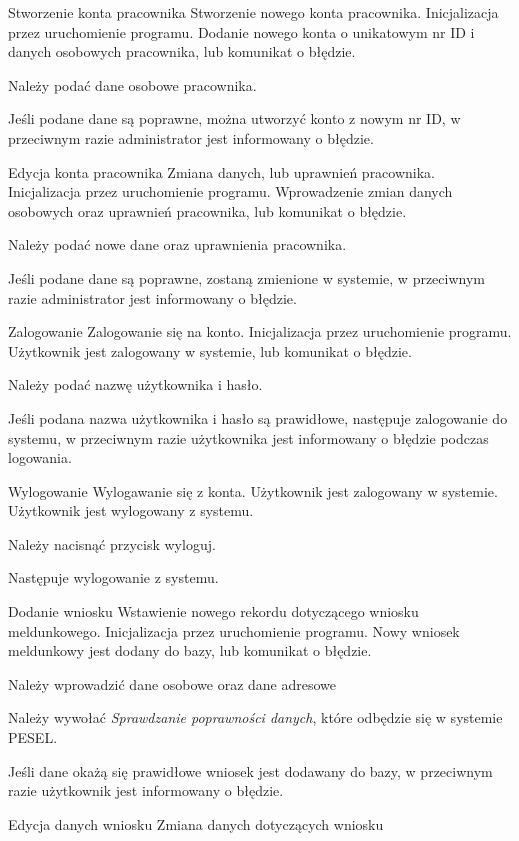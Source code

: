\documentclass[12pt]{article}
\begin{document}
\scenario
    {Stworzenie konta pracownika}
    {Stworzenie nowego konta pracownika.}
    {Inicjalizacja przez uruchomienie programu.}
    {Dodanie nowego konta o unikatowym nr ID i danych osobowych pracownika, lub komunikat o błędzie.}
    {
        \item Należy podać dane osobowe pracownika.
        \item Jeśli podane dane są poprawne, można utworzyć konto z nowym nr ID, w przeciwnym razie administrator jest informowany o błędzie.
    }
\scenario
    {Edycja konta pracownika}
    {Zmiana danych, lub uprawnień pracownika.}
    {Inicjalizacja przez uruchomienie programu.}
    {Wprowadzenie zmian danych osobowych oraz uprawnień pracownika, lub komunikat o błędzie.}
    {
        \item Należy podać nowe dane oraz uprawnienia pracownika.
        \item Jeśli podane dane są poprawne, zostaną zmienione w systemie, w przeciwnym razie administrator jest informowany o błędzie.
    }
\scenario
    {Zalogowanie}
    {Zalogowanie się na konto.}
    {Inicjalizacja przez uruchomienie programu.}
    {Użytkownik jest zalogowany w systemie, lub komunikat o błędzie.}
    {
        \item Należy podać nazwę użytkownika i hasło.
        \item Jeśli podana nazwa użytkownika i hasło są prawidłowe, następuje zalogowanie do systemu, w przeciwnym razie użytkownika jest informowany o błędzie podczas logowania.
    }
\scenario
    {Wylogowanie}
    {Wylogawanie się z konta.}
    {Użytkownik jest zalogowany w systemie. }
    {Użytkownik jest wylogowany z systemu.}
    {
        \item Należy nacisnąć przycisk wyloguj.
        \item Następuje wylogowanie z systemu.
    }
\scenario
    {Dodanie wniosku}
    {Wstawienie nowego rekordu dotyczącego wniosku meldunkowego.}
    {Inicjalizacja przez uruchomienie programu.}
    {Nowy wniosek meldunkowy jest dodany do bazy, lub komunikat o błędzie.}
    {
        \item Należy wprowadzić dane osobowe oraz dane adresowe
        \item Należy wywołać \textit{Sprawdzanie poprawności danych}, które odbędzie się w systemie PESEL.
        \item Jeśli dane okażą się prawidłowe wniosek jest dodawany do bazy, w przeciwnym razie użytkownik jest informowany o błędzie.
    }
\scenario
    {Edycja danych wniosku}
    {Zmiana danych dotyczących wniosku}
\end{document}
